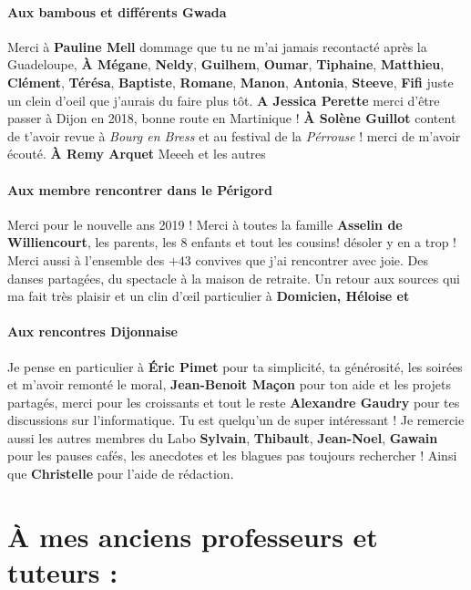 \documentclass[../thesis.tex]{subfiles}
\begin{document}
\paragraph{Aux bambous et différents Gwada} Merci à \textbf{Pauline Mell} dommage que tu ne m'ai jamais recontacté après la Guadeloupe, \textbf{À Mégane}, \textbf{Neldy}, \textbf{Guilhem}, \textbf{Oumar}, \textbf{Tiphaine}, \textbf{Matthieu}, \textbf{Clément}, \textbf{Térésa}, \textbf{Baptiste}, \textbf{Romane}, \textbf{Manon}, \textbf{Antonia}, \textbf{Steeve}, \textbf{Fifi} juste un clein d'oeil que j'aurais du faire plus tôt. \textbf{A Jessica Perette} merci d'être passer à Dijon en 2018, bonne route en Martinique ! \textbf{À Solène Guillot} content de t'avoir revue à \textit{Bourg en Bress} et au festival de la \textit{Pérrouse} ! merci de m'avoir écouté. \textbf{À Remy Arquet} Meeeh et les autres

\paragraph{Aux membre rencontrer dans le Périgord} Merci pour le nouvelle ans 2019 ! Merci à toutes la famille \textbf{Asselin de Williencourt}, les parents, les 8 enfants et tout les cousins! désoler y en a trop !
Merci aussi à l'ensemble des $+43$ convives que j'ai rencontrer avec joie. Des danses partagées, du spectacle à la maison de retraite.
Un retour aux sources qui ma fait très plaisir et un clin d'œil particulier à \textbf{Domicien, Héloise et }

\paragraph{Aux rencontres Dijonnaise} Je pense en particulier à \textbf{Éric Pimet} pour ta simplicité, ta générosité, les soirées et m'avoir remonté le moral,
\textbf{Jean-Benoit Maçon} pour ton aide et les projets partagés, merci pour les croissants et tout le reste
\textbf{Alexandre Gaudry} pour tes discussions sur l'informatique. Tu est quelqu'un de super intéressant !
Je remercie aussi les autres membres du Labo \textbf{Sylvain}, \textbf{Thibault}, \textbf{Jean-Noel}, \textbf{Gawain}
pour les pauses cafés, les anecdotes et les blagues pas toujours rechercher ! Ainsi que \textbf{Christelle} pour l'aide de rédaction.

\section*{À mes anciens professeurs et tuteurs :}
\end{document}
